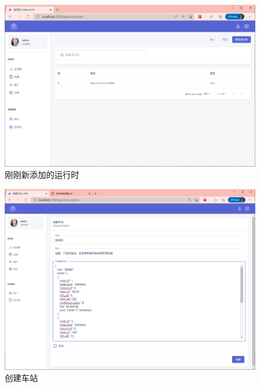 \begin{figure}[htbp!]
    \centering
    \includegraphics[width=\textwidth]{figures/png/new_exes.png}
    \caption{\label{new_exes}刚刚新添加的运行时}
\end{figure}

\begin{figure}[htbp!]
    \centering
    \includegraphics[width=\textwidth]{figures/png/create_sta.png}
    \caption{\label{create_sta}创建车站}
\end{figure}

